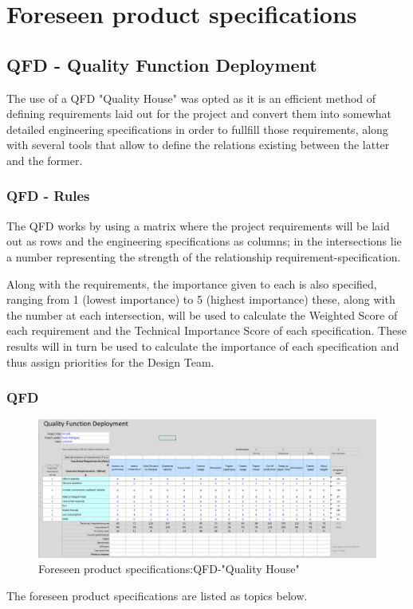 \section{Foreseen product specifications}
\label{sec:org31f7574}
\subsection{QFD - Quality Function Deployment}
The use of a QFD "Quality House" was opted as it is an efficient method of defining requirements laid out for the project and convert them into somewhat detailed engineering specifications in order to fullfill those requirements, along with several tools that allow to define the relations existing between the latter and the former.
\subsubsection{QFD - Rules}
The QFD works by using a matrix where the project requirements will be laid out as rows and the engineering specifications as columns; in the intersections lie a number representing the strength of the relationship requirement-specification.

Along with the requirements, the importance given to each is also specified, ranging from 1 (lowest importance) to 5 (highest importance) these, along with the number at each intersection, will be used to calculate the Weighted Score of each requirement and the Technical Importance Score of each specification. These results will in turn be used to calculate the importance of each specification and thus assign priorities for the Design Team.
\subsubsection{QFD}
\begin{figure}[!ht]
\centering
\includegraphics[width=1.0\textwidth]{./sec/img/QFD_Initial.png}
\caption{\label{fig:initial-design}Foreseen product specifications:QFD-"Quality House"}
\end{figure}
\newpage
The foreseen product specifications are listed as topics below.

